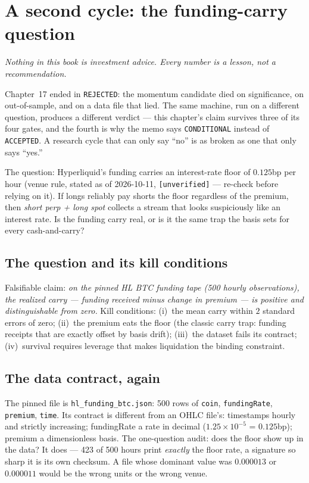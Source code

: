 \chapter{A second cycle: the funding-carry question}\label{ch:cycle2}

\noindent\emph{Nothing in this book is investment advice. Every
number is a lesson, not a recommendation.}

\medskip
\noindent Chapter~17 ended in \texttt{REJECTED}: the momentum
candidate died on significance, on out-of-sample, and on a data
file that lied. The same machine, run on a different question,
produces a different verdict --- this chapter's claim survives
three of its four gates, and the fourth is why the memo says
\texttt{CONDITIONAL} instead of \texttt{ACCEPTED}. A research
cycle that can only say ``no'' is as broken as one that only
says ``yes.''

The question: Hyperliquid's funding carries an interest-rate
floor of $0.125$bp per hour (venue rule, stated as of
2026-10-11, \texttt{[unverified]} --- re-check before relying
on it). If longs reliably pay shorts the floor regardless of
the premium, then \emph{short perp + long spot} collects a
stream that looks suspiciously like an interest rate. Is the
funding carry real, or is it the same trap the basis sets for
every cash-and-carry?

\section{The question and its kill conditions}\label{sec:q18}

Falsifiable claim: \emph{on the pinned HL BTC funding tape
(500 hourly observations), the realized carry --- funding
received minus change in premium --- is positive and
distinguishable from zero.} Kill conditions: (i)~the mean carry
within $2$ standard errors of zero; (ii)~the premium eats the
floor (the classic carry trap: funding receipts that are
exactly offset by basis drift); (iii)~the dataset fails its
contract; (iv)~survival requires leverage that makes
liquidation the binding constraint.

\section{The data contract, again}\label{sec:contract18}

The pinned file is \texttt{hl\_funding\_btc.json}: 500 rows of
\texttt{coin}, \texttt{fundingRate}, \texttt{premium},
\texttt{time}. Its contract is different from an OHLC file's:
timestamps hourly and strictly increasing; fundingRate a rate
in decimal ($1.25\times10^{-5}$ = $0.125$bp); premium a
dimensionless basis. The one-question audit: does the floor
show up in the data? It does --- 423 of 500 hours print
\emph{exactly} the floor rate, a signature so sharp it is its
own checksum. A file whose dominant value was $0.000013$ or
$0.000011$ would be the wrong units or the wrong venue.

